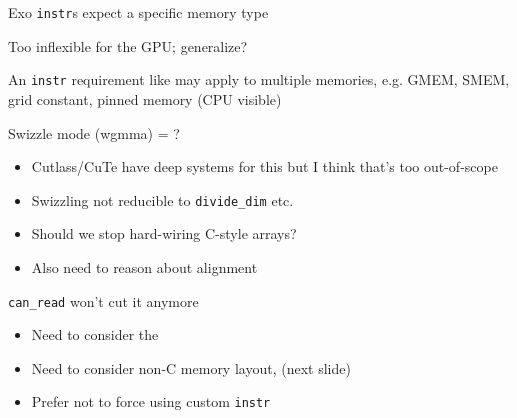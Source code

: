 \begin{minipage}[t]{0.48\textwidth}\fixminipage
Exo \texttt{instr}s expect a specific memory type

Too inflexible for the GPU; generalize?


An \texttt{instr} requirement like  may apply to multiple memories, e.g. GMEM, SMEM, grid constant, pinned memory (CPU visible)


Swizzle mode (wgmma) = ?

\begin{itemize}
  \item Cutlass/CuTe have deep systems for this but I think that's too out-of-scope
  \item Swizzling not reducible to \texttt{divide\_dim} etc.
  \item Should we stop hard-wiring C-style arrays?
  \item Also need to reason about alignment
\end{itemize}


\texttt{can\_read} won't cut it anymore
\begin{itemize}
  \item Need to consider the 
  \item Need to consider non-C memory layout,  (next slide)
  \item Prefer not to force using custom \texttt{instr}
\end{itemize}


\end{minipage}
\hfill
